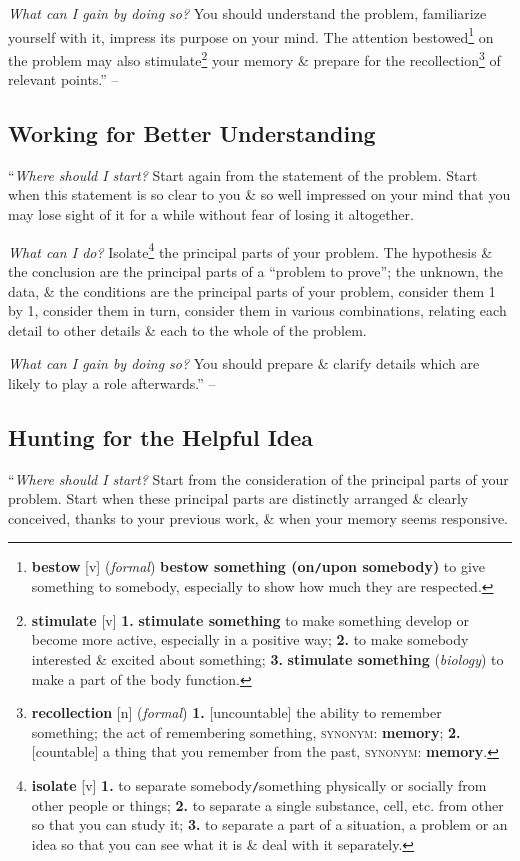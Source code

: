 \documentclass[oneside]{book}
\numberwithin{equation}{section}
\begin{document}
\textit{What can I gain by doing so?} You should understand the problem, familiarize yourself with it, impress its purpose on your mind. The attention bestowed\footnote{\textbf{bestow} [v] (\textit{formal}) \textbf{bestow something (on\texttt{/}upon somebody)} to give something to somebody, especially to show how much they are respected.} on the problem may also stimulate\footnote{\textbf{stimulate} [v] \textbf{1.} \textbf{stimulate something} to make something develop or become more active, especially in a positive way; \textbf{2.} to make somebody interested  \& excited about something; \textbf{3.} \textbf{stimulate something} (\textit{biology}) to make a part of the body function.} your memory \& prepare for the recollection\footnote{\textbf{recollection} [n] (\textit{formal}) \textbf{1.} [uncountable] the ability to remember something; the act of remembering something, \textsc{synonym}: \textbf{memory}; \textbf{2.} [countable] a thing that you remember from the past, \textsc{synonym}: \textbf{memory}.} of relevant points.'' -- \cite[p. 33]{Polya2014}

\subsection{Working for Better Understanding}
``\textit{Where should I start?} Start again from the statement of the problem. Start when this statement is so clear to you \& so well impressed on your mind that you may lose sight of it for a while without fear of losing it altogether.

\textit{What can I do?} Isolate\footnote{\textbf{isolate} [v] \textbf{1.} to separate somebody\texttt{/}something physically or socially from other people or things; \textbf{2.} to separate a single substance, cell, etc. from other so that you can study it; \textbf{3.} to separate a part of a situation, a problem or an idea so that you can see what it is \& deal with it separately.} the principal parts of your problem. The hypothesis \& the conclusion are the principal parts of a ``problem to prove''; the unknown, the data, \& the conditions are the principal parts of your problem, consider them 1 by 1, consider them in turn, consider them in various combinations, relating each detail to other details \& each to the whole of the problem.

\textit{What can I gain by doing so?} You should prepare \& clarify details which are likely to play a role afterwards.'' -- \cite[p. 33]{Polya2014}

\subsection{Hunting for the Helpful Idea}
``\textit{Where should I start?} Start from the consideration of the principal parts of your problem. Start when these principal parts are distinctly arranged \& clearly conceived, thanks to your previous work, \& when your memory seems responsive.
\end{document}
